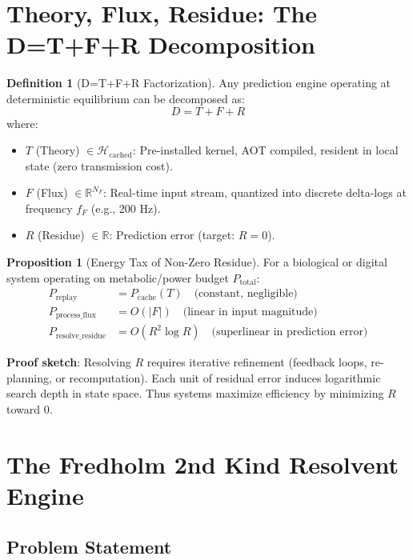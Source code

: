 \documentclass[11pt,oneside]{article}
\theoremstyle{definition}
\newtheorem{definition}[theorem]{Definition}
\newtheorem{proposition}[theorem]{Proposition}
\begin{document}
\section{Theory, Flux, Residue: The D=T+F+R Decomposition}

\begin{definition}[D=T+F+R Factorization]
Any prediction engine operating at deterministic equilibrium can be decomposed as:
\[D = T + F + R\]
where:
\begin{itemize}
  \item $T$ (Theory) $\in \mathcal{H}_{\text{cached}}$: Pre-installed kernel, AOT compiled, resident in local state (zero transmission cost).
  \item $F$ (Flux) $\in \mathbb{R}^{N_F}$: Real-time input stream, quantized into discrete delta-logs at frequency $f_F$ (e.g., 200 Hz).
  \item $R$ (Residue) $\in \mathbb{R}$: Prediction error (target: $R = 0$).
\end{itemize}
\end{definition}

\begin{proposition}[Energy Tax of Non-Zero Residue]
For a biological or digital system operating on metabolic/power budget $P_{\text{total}}$:
\begin{align}
P_{\text{replay}} &= P_{\text{cache}}(T) \quad \text{(constant, negligible)}\\
P_{\text{process\_flux}} &= O(|F|) \quad \text{(linear in input magnitude)}\\
P_{\text{resolve\_residue}} &= O(R^2 \log R) \quad \text{(superlinear in prediction error)}
\end{align}

\textbf{Proof sketch}: Resolving $R$ requires iterative refinement (feedback loops, re-planning, or recomputation). Each unit of residual error induces logarithmic search depth in state space. Thus systems maximize efficiency by minimizing $R$ toward 0.
\end{proposition}

\section{The Fredholm 2nd Kind Resolvent Engine}

\subsection{Problem Statement}
\end{document}
